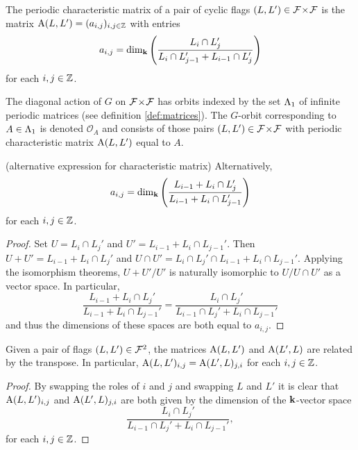 \documentclass[a4paper, 11pt]{report}
\begin{document}
\begin{definition}\label{def:characteristic-matrix}
The periodic characteristic matrix of a pair of cyclic flags $(L,L')\in{\mathcal{F}\!\times\!\mathcal{F}}$ is the matrix $\operatorname{A}(L,L')=(a_{i,j})_{i,j\in\mathbb{Z}}$ with entries
\begin{equation*}
a_{i,j} = \dim_{\mathbf{k}}\left(\frac{L_i\cap L_j'}{L_i\cap L_{j-1}' + L_{i-1}\cap L_j'}\right)
\end{equation*}
for each $i,j\in\mathbb{Z}$.
\end{definition}

The diagonal action of $G$ on ${\mathcal{F}\!\times\!\mathcal{F}}$ has orbits indexed by the set ${\Lambda_1}$ of infinite periodic matrices (see definition \ref{def:matrices}). The $G$-orbit corresponding to $A\in{\Lambda_1}$ is denoted $\mathcal{O}_A$ and consists of those pairs $(L,L')\in{\mathcal{F}\!\times\!\mathcal{F}}$ with periodic characteristic matrix $\operatorname{A}(L,L')$ equal to $A$.

\begin{lemma}(alternative expression for characteristic matrix)
Alternatively,
\begin{equation*}
a_{i,j} = \dim_{\mathbf{k}}\left(\frac{L_{i-1} + L_i\cap L_j'}{L_{i-1} + L_i\cap L_{j-1}'}\right)
\end{equation*}
for each $i,j\in\mathbb{Z}$.
\end{lemma}
\begin{proof}
Set $U=L_i\cap L_j'$ and $U'=L_{i-1}+L_i\cap L_{j-1}'$. Then $U+U'=L_{i-1}+L_i\cap L_j'$ and $U\cap U'= L_i\cap L_j'\cap L_{i-1} + L_i\cap L_{j-1}'$. Applying the isomorphism theorems, ${U+U'}/{U'}$ is naturally isomorphic to $U/{U\cap U'}$ as a vector space. In particular,
\begin{equation*}
\frac{L_{i-1}+L_i\cap L_j'}{L_{i-1} + L_i\cap L_{j-1}'} = \frac{L_i\cap L_j'}{L_{i-1}\cap L_j' + L_i\cap L_{j-1}'}
\end{equation*}
and thus the dimensions of these spaces are both equal to $a_{i,j}$.
\end{proof}

\begin{lemma}
Given a pair of flags $(L,L')\in\mathcal{F}^2$, the matrices $\operatorname{A}(L,L')$ and $\operatorname{A}(L',L)$ are related by the transpose. In particular, $\operatorname{A}(L,L')_{i,j} = \operatorname{A}(L',L)_{j,i}$ for each $i,j\in\mathbb{Z}$.
\end{lemma}
\begin{proof}
By swapping the roles of $i$ and $j$ and swapping $L$ and $L'$ it is clear that $\operatorname{A}(L,L')_{i,j}$ and $\operatorname{A}(L',L)_{j,i}$ are both given by the dimension of the $\mathbf{k}$-vector space
\begin{equation*}
\frac{L_i\cap L_j'}{L_{i-1}\cap L_j' + L_i\cap L_{j-1}'},
\end{equation*}
for each $i,j\in\mathbb{Z}$.
\end{proof}
\end{document}
